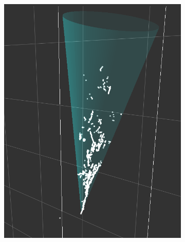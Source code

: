 \begin{figure}[htbp]
\begin{center}
\begin{subfigure}{0.45\textwidth}
\includegraphics[angle=270,width=\linewidth]{figs/reco/single_e_Evt1.png}
\caption{}
\label{fig:shr_reco_example_3d}
\end{subfigure}
\begin{subfigure}{0.4\textwidth}

\end{subfigure}
\end{center}
\end{figure}
